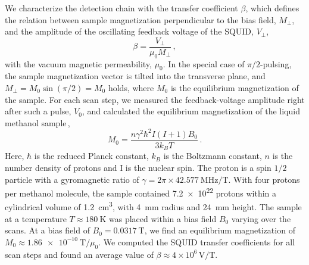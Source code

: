 We characterize the detection chain with the transfer coefficient $\beta$, which defines the relation between sample magnetization perpendicular to the bias field, $M_\perp$, and the amplitude of the oscillating feedback voltage of the SQUID, $V_\perp$,
\begin{equation}
    \beta = \frac{V_\perp}{\mu_0 M_\perp}\,,
    \label{eq:beta}
\end{equation}
with the vacuum magnetic permeability, $\mu_0$. 
In the special case of $\pi/2$-pulsing, the sample magnetization vector is tilted into the transverse plane, and $M_\perp = M_0 \sin(\pi/2)= M_0$ holds, where $M_0$ is the equilibrium magnetization of the sample.
For each scan step, we measured the feedback-voltage amplitude right after such a pulse, $V_0$, and calculated the equilibrium magnetization of the liquid methanol sample\,\cite{Abragam1961_NuclearMagnetism},
\begin{equation}
    M_0 = \frac{n \gamma^2 \hbar^2 I(I+1) B_0}{3 k_B T}\,.
\end{equation}
Here, $\hbar$ is the reduced Planck constant, $k_B$ is the Boltzmann constant, $n$ is the number density of protons and I is the nuclear spin.
The proton is a spin $1/2$ particle with a gyromagnetic ratio of $\gamma=2\pi\times\SI{42.577}{\MHz/\tesla}$.
With four protons per methanol molecule, the sample contained \SI{7.2e22}{} protons within a cylindrical volume of \SI{1.2}{\cm^3}, with \SI{4}{\mm} radius and \SI{24}{\mm} height.
The sample at a temperature $T \approx \SI{180}{\kelvin}$ was placed within a bias field $B_0$ varying over the scans.
At a bias field of $B_0=\SI{0.0317}{\tesla}$, we find an equilibrium magnetization of $M_0\approx \SI{1.86e-10}{\tesla}/\mu_0$.
We computed the SQUID transfer coefficients for all scan steps and found an average value of $\beta\approx 4\times 10^6\,\mathrm{V/T}$.


